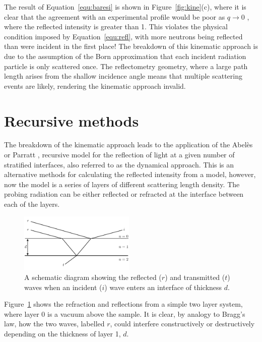 \documentclass[
 reprint,
 superscriptaddress,
 amsmath,amssymb,
 aps,
]{revtex4-1}
\begin{document}
%
The result of Equation~\ref{equ:baresi} is shown in Figure~\ref{fig:kine}(c), where it is clear that the agreement with an experimental profile would be poor as $q \to 0$ \cite{majkrzak_exact_1998}, where the reflected intensity is greater than \num{1}. 
This violates the physical condition imposed by Equation~\ref{equ:refl}, with more neutrons being reflected than were incident in the first place!
The breakdown of this kinematic approach is due to the assumption of the Born approximation that each incident radiation particle is only scattered once. 
The reflectometry geometry, where a large path length arises from the shallow incidence angle means that multiple scattering events are likely, rendering the kinematic approach invalid. 

\section{Recursive methods}
The breakdown of the kinematic approach leads to the application of the Abel\`{e}s \cite{abeles_sur_1948} or Parratt \cite{parratt_surface_1954}, recursive model for the reflection of light at a given number of stratified interfaces, also referred to as the dynamical approach. 
This is an alternative methods for calculating the reflected intensity from a model, however, now the model is a series of layers of different scattering length density. 
The probing radiation can be either reflected or refracted at the interface between each of the layers. 
%
\begin{figure}[t]
    \includegraphics[width=0.49\textwidth]{refr}
    \caption{A schematic diagram showing the reflected ($r$) and transmitted ($t$) waves when an incident ($i$) wave enters an interface of thickness $d$.}
    \label{fig:refr}
\end{figure}
% 
Figure~\ref{fig:refr} shows the refraction and reflections from a simple two layer system, where layer \num{0} is a vacuum above the sample. 
It is clear, by analogy to Bragg's law, how the two waves, labelled $r$, could interfere constructively or destructively depending on the thickness of layer \num{1}, $d$.
\end{document}

